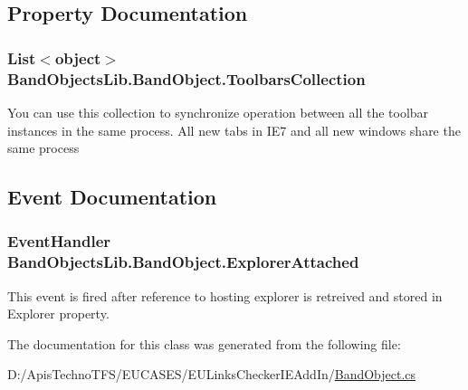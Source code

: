 \subsection{Property Documentation}
\hypertarget{class_band_objects_lib_1_1_band_object_aa811a5a74305f57a928f86bf1648dd71}{
\subsubsection[{Toolbars\+Collection}]{\setlength{\rightskip}{0pt plus 5cm}List$<$object$>$ Band\+Objects\+Lib.\+Band\+Object.\+Toolbars\+Collection\hspace{0.3cm}{\ttfamily [get]}}}\label{class_band_objects_lib_1_1_band_object_aa811a5a74305f57a928f86bf1648dd71}


You can use this collection to synchronize operation between all the toolbar instances in the same process. All new tabs in I\+E7 and all new windows share the same process 



\subsection{Event Documentation}
\hypertarget{class_band_objects_lib_1_1_band_object_aa0be81ece693c5b4b88ef60827f23a02}{
\subsubsection[{Explorer\+Attached}]{\setlength{\rightskip}{0pt plus 5cm}Event\+Handler Band\+Objects\+Lib.\+Band\+Object.\+Explorer\+Attached}}\label{class_band_objects_lib_1_1_band_object_aa0be81ece693c5b4b88ef60827f23a02}


This event is fired after reference to hosting explorer is retreived and stored in Explorer property. 



The documentation for this class was generated from the following file\+:\begin{DoxyCompactItemize}
\item 
D\+:/\+Apis\+Techno\+T\+F\+S/\+E\+U\+C\+A\+S\+E\+S/\+E\+U\+Links\+Checker\+I\+E\+Add\+In/\hyperlink{_band_object_8cs}{Band\+Object.\+cs}\end{DoxyCompactItemize}
